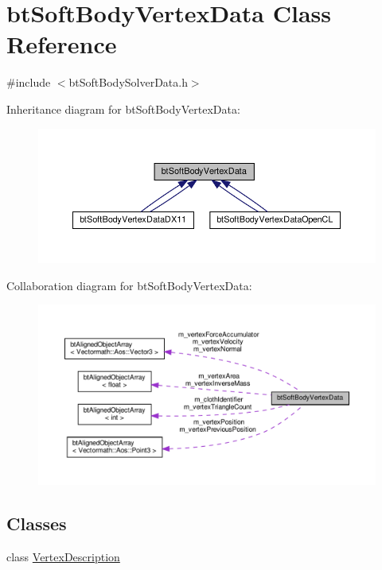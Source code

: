 \hypertarget{classbtSoftBodyVertexData}{}\section{bt\+Soft\+Body\+Vertex\+Data Class Reference}
\label{classbtSoftBodyVertexData}


{\ttfamily \#include $<$bt\+Soft\+Body\+Solver\+Data.\+h$>$}



Inheritance diagram for bt\+Soft\+Body\+Vertex\+Data\+:
\nopagebreak
\begin{figure}[H]
\begin{center}
\leavevmode
\includegraphics[width=350pt]{classbtSoftBodyVertexData__inherit__graph}
\end{center}
\end{figure}


Collaboration diagram for bt\+Soft\+Body\+Vertex\+Data\+:
\nopagebreak
\begin{figure}[H]
\begin{center}
\leavevmode
\includegraphics[width=350pt]{classbtSoftBodyVertexData__coll__graph}
\end{center}
\end{figure}
\subsection*{Classes}
\begin{DoxyCompactItemize}
\item 
class \hyperlink{classbtSoftBodyVertexData_1_1VertexDescription}{Vertex\+Description}
\end{DoxyCompactItemize}
